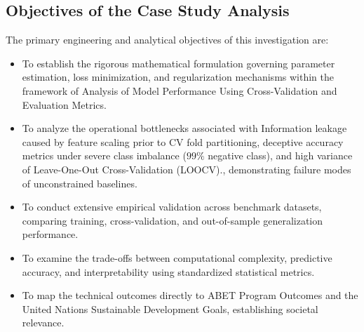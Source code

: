 \subsection{Objectives of the Case Study Analysis}
The primary engineering and analytical objectives of this investigation are:
\begin{itemize}
  \item To establish the rigorous mathematical formulation governing parameter estimation, loss minimization, and regularization mechanisms within the framework of Analysis of Model Performance Using Cross-Validation and Evaluation Metrics.
  \item To analyze the operational bottlenecks associated with Information leakage caused by feature scaling prior to CV fold partitioning, deceptive accuracy metrics under severe class imbalance ($99\%$ negative class), and high variance of Leave-One-Out Cross-Validation (LOOCV)., demonstrating failure modes of unconstrained baselines.
  \item To conduct extensive empirical validation across benchmark datasets, comparing training, cross-validation, and out-of-sample generalization performance.
  \item To examine the trade-offs between computational complexity, predictive accuracy, and interpretability using standardized statistical metrics.
  \item To map the technical outcomes directly to ABET Program Outcomes and the United Nations Sustainable Development Goals, establishing societal relevance.
\end{itemize}
